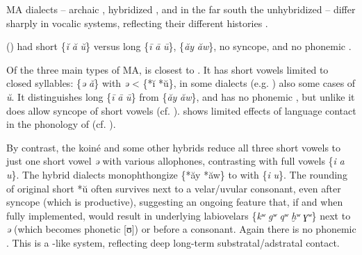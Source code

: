 \documentclass[output=paper]{langsci/langscibook}
\begin{document}
MA dialects – archaic , hybridized , and in the far south the unhybridized  – differ sharply in vocalic systems, reflecting their different histories \citep{Heath2018}.

 () had short \{\textit{ĭ} \textit{ă} \textit{ŭ}\} versus long \{\textit{ī} \textit{ā} \textit{ū}\},  \{\textit{ăy} \textit{ăw}\}, no syncope, and no phonemic . 

Of the three main types of MA,  is closest to . It has short vowels limited to closed syllables: \{\textit{ə} \textit{ă}\} with \textit{ə} < \{*ĭ *ŭ\}, in some dialects (e.g. ) also some cases of \textit{ŭ}. It distinguishes long \{\textit{ī} \textit{ā} \textit{ū}\} from  \{\textit{ăy} \textit{ăw}\}, and has no phonemic , but unlike  it does allow syncope of short vowels (cf. \citealt{Taine-Cheikh1988article}).  shows limited effects of language contact in the phonology of   (cf. \citealt{Taine-Cheikh1997Zenaga}).

By contrast, the koiné and some other hybrids reduce all three short vowels to just one short vowel \textit{ə} with various allophones, contrasting with full vowels \{\textit{i} \textit{a} \textit{u}\}. The hybrid dialects monophthongize \{*ăy *ăw\} to  with \{\textit{i} \textit{u}\}. The rounding of original short *ŭ often survives next to a velar/uvular consonant, even after syncope (which is productive), suggesting an ongoing feature  that, if and when fully implemented, would result in underlying labiovelars \{\textit{kʷ} \textit{gʷ} \textit{qʷ} \textit{ḫʷ} \textit{ɣʷ}\} next to \textit{ə} (which becomes phonetic [ʊ]) or before a consonant. Again there is no phonemic . This is a -like system, reflecting deep long-term substratal/adstratal contact.
\end{document}
